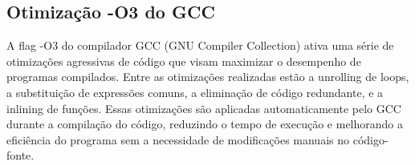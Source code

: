 \subsection{Otimização -O3 do GCC}

A flag -O3 do compilador GCC (GNU Compiler Collection) ativa uma série de otimizações agressivas de código que visam maximizar o desempenho de programas compilados. Entre as otimizações realizadas estão a unrolling de loops, a substituição de expressões comuns, a eliminação de código redundante, e a inlining de funções. Essas otimizações são aplicadas automaticamente pelo GCC durante a compilação do código, reduzindo o tempo de execução e melhorando a eficiência do programa sem a necessidade de modificações manuais no código-fonte.
